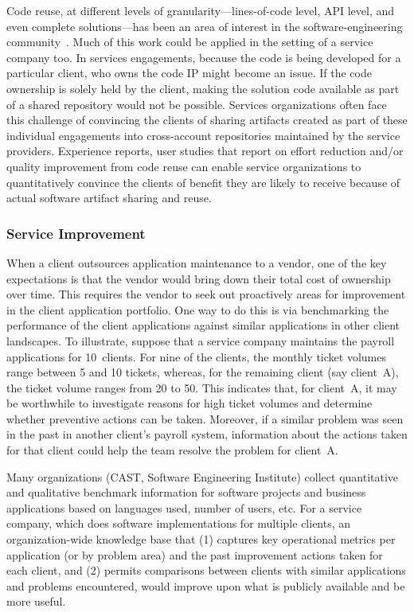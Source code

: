 Code reuse, at different levels of granularity---lines-of-code level, API level,
and even complete solutions---has been an area of interest in the
software-engineering community~\cite{Reiss:2009,Holmes:2013}. Much of this work
could be applied in the setting of a service company too. In services engagements, because the code is being developed for a particular client, who owns the code IP might become an issue. If the code ownership is solely held by the client, making the solution code available as part of a shared repository would not be possible. Services organizations often face this challenge of convincing the clients of sharing artifacts created as part of these individual engagements into cross-account repositories maintained by the service providers. Experience reports, user studies that report on effort reduction and/or quality improvement from code reuse can enable service organizations to quantitatively convince the clients of benefit they are likely to receive because of actual software artifact sharing and reuse.  

\subsubsection{Service Improvement}

When a client outsources application maintenance to a vendor, one of the key
expectations is that the vendor would bring down their total cost of ownership
over time. This requires the vendor to seek out proactively areas for
improvement in the client application portfolio. One way to do this is via
benchmarking the performance of the client applications against similar
applications in other client landscapes. To illustrate, suppose that a service
company maintains the payroll applications for 10~clients. For nine of the
clients, the monthly ticket volumes range between 5 and 10 tickets, whereas, for
the remaining client (say client~A), the ticket volume ranges from 20 to
50. This indicates that, for client~A, it may be worthwhile to investigate
reasons for high ticket volumes and determine whether preventive actions can be
taken. Moreover, if a similar problem was seen in the past in another client's
payroll system, information about the actions taken for that client could help
the team resolve the problem for client~A.

Many organizations (\eg CAST, Software Engineering Institute) collect
quantitative and qualitative benchmark information for software projects and
business applications based on languages used, number of users, etc.  For a
service company, which does software implementations for multiple clients, an
organization-wide knowledge base that (1) captures key operational metrics per
application (or by problem area) and the past improvement actions taken for each
client, and (2) permits comparisons between clients with similar applications
and problems encountered, would improve upon what is publicly available and be
more useful.

